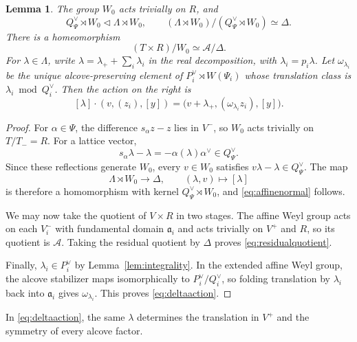 \documentclass[11pt,a4paper,reqno]{amsart}
\theoremstyle{plain}
\newtheorem{lemma}[theorem]{Lemma}
\theoremstyle{definition}
\theoremstyle{remark}
\numberwithin{equation}{section}
\newcommand{\fa}{\mathfrak a}
\begin{document}
\begin{lemma}\label{lem:residualquotient} The group $W_0$ acts trivially on $R$, and
\begin{equation}\label{eq:affinenormal}
Q_\Psi^\vee\rtimes W_0\triangleleft\Lambda\rtimes W_0, \qquad (\Lambda\rtimes W_0)/(Q_\Psi^\vee\rtimes W_0)\simeq\Delta.
\end{equation}
There is a homeomorphism
\begin{equation}\label{eq:residualquotient}
(T\times R)/W_0\simeq\mathcal A/\Delta.
\end{equation}
For $\lambda\in\Lambda$, write $\lambda=\lambda_++\sum_i\lambda_i$ in the real decomposition, with $\lambda_i=p_i\lambda$. Let $\omega_{\lambda_i}$ be the unique alcove-preserving element of $P_i^\vee\rtimes W(\Psi_i)$ whose translation class is $\lambda_i\bmod Q_i^\vee$. Then the action on the right is
\begin{equation}\label{eq:deltaaction}
[\lambda]\cdot(v,(z_i),[y])= \bigl(v+\lambda_+,(\omega_{\lambda_i}z_i),[y]\bigr).
\end{equation}
\end{lemma}
\begin{proof}
For $\alpha\in\Psi$, the difference $s_\alpha z-z$ lies in $V^-$, so $W_0$ acts trivially on $T/T_-=R$. For a lattice vector,
\[
s_\alpha\lambda-\lambda =-\alpha(\lambda)\alpha^\vee\in Q_\Psi^\vee.
\]
Since these reflections generate $W_0$, every $v\in W_0$ satisfies $v\lambda-\lambda\in Q_\Psi^\vee$. The map
\[
\Lambda\rtimes W_0\longrightarrow\Delta,\qquad (\lambda,v)\longmapsto[\lambda]
\]
is therefore a homomorphism with kernel $Q_\Psi^\vee\rtimes W_0$, and \eqref{eq:affinenormal} follows.

We may now take the quotient of $V\times R$ in two stages. The affine Weyl group acts on each $V_i^-$ with fundamental domain $\fa_i$ and acts trivially on $V^+$ and $R$, so its quotient is $\mathcal A$. Taking the residual quotient by $\Delta$ proves \eqref{eq:residualquotient}.

Finally, $\lambda_i\in P_i^\vee$ by Lemma~\ref{lem:integrality}. In the extended affine Weyl group, the alcove stabilizer maps isomorphically to $P_i^\vee/Q_i^\vee$, so folding translation by $\lambda_i$ back into $\fa_i$ gives $\omega_{\lambda_i}$. This proves \eqref{eq:deltaaction}.
\end{proof}

In \eqref{eq:deltaaction}, the same $\lambda$ determines the translation in $V^+$ and the symmetry of every alcove factor.
\end{document}
